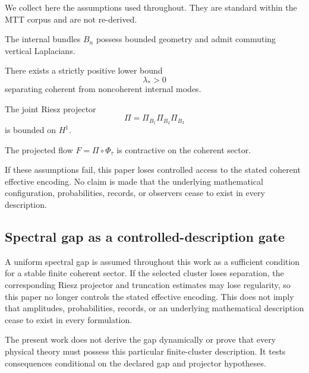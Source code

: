 \documentclass[11pt]{article}
\begin{document}
We collect here the assumptions used throughout.
They are standard within the MTT corpus and are not re-derived.

\begin{assumption}
The internal bundles $B_n$ possess bounded geometry and admit commuting vertical Laplacians.
\end{assumption}

\begin{assumption}
There exists a strictly positive lower bound
\[
\lambda_{\ast} > 0
\]
separating coherent from noncoherent internal modes.
\end{assumption}

\begin{assumption}
The joint Riesz projector
\[
\Pi = \Pi_{B_1}\Pi_{B_2}\Pi_{B_3}
\]
is bounded on $H^1$.
\end{assumption}

\begin{assumption}
The projected flow $F=\Pi\circ\Phi_\tau$ is contractive on the coherent sector.
\end{assumption}

\begin{remark}
If these assumptions fail, this paper loses controlled access to the stated
coherent effective encoding.  No claim is made that the underlying
mathematical configuration, probabilities, records, or observers cease to
exist in every description.
\end{remark}

\subsection{Spectral gap as a controlled-description gate}

A uniform spectral gap is assumed throughout this work as a sufficient
condition for a stable finite coherent sector. If the selected cluster loses
separation, the corresponding Riesz projector and truncation estimates may
lose regularity, so this paper no longer controls the stated effective
encoding. This does not imply that amplitudes, probabilities, records, or an
underlying mathematical description cease to exist in every formulation.

The present work does not derive the gap dynamically or prove that every
physical theory must possess this particular finite-cluster description. It
tests consequences conditional on the declared gap and projector hypotheses.
\end{document}
